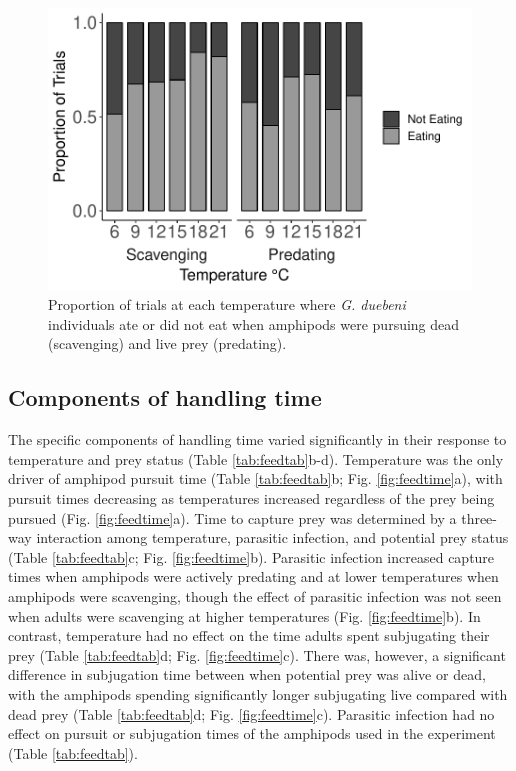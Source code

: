 \begin{figure}[H]
    \centering
    \includegraphics[scale=0.7]{figures/ch4/propeat.pdf}
  \caption [Proportion of \emph{G. duebeni} eating across a range of temperatures when prey were mobile or sessile]{Proportion of trials at each temperature where \emph{G. duebeni} individuals ate or did not eat when amphipods were pursuing dead (scavenging) and live prey (predating).} 
    \label{fig:propeat}
\end{figure}

\subsection{Components of handling time}

The specific components of handling time varied significantly in their response to temperature and prey status (Table \ref{tab:feedtab}b-d). Temperature was the only driver of amphipod pursuit time (Table \ref{tab:feedtab}b; Fig. \ref{fig:feedtime}a), with pursuit times decreasing as temperatures increased regardless of the prey being pursued (Fig. \ref{fig:feedtime}a). Time to capture prey was determined by a three-way interaction among temperature, parasitic infection, and potential prey status (Table \ref{tab:feedtab}c; Fig. \ref{fig:feedtime}b). Parasitic infection increased capture times when amphipods were actively predating and at lower temperatures when amphipods were scavenging, though the effect of parasitic infection was not seen when adults were scavenging at higher temperatures (Fig. \ref{fig:feedtime}b). In contrast, temperature had no effect on the time adults spent subjugating their prey (Table \ref{tab:feedtab}d; Fig. \ref{fig:feedtime}c). There was, however, a significant difference in subjugation time between when potential prey was alive or dead, with the amphipods spending significantly longer subjugating live compared with dead prey (Table \ref{tab:feedtab}d; Fig. \ref{fig:feedtime}c). Parasitic infection had no effect on pursuit or subjugation times of the amphipods used in the experiment (Table \ref{tab:feedtab}).


